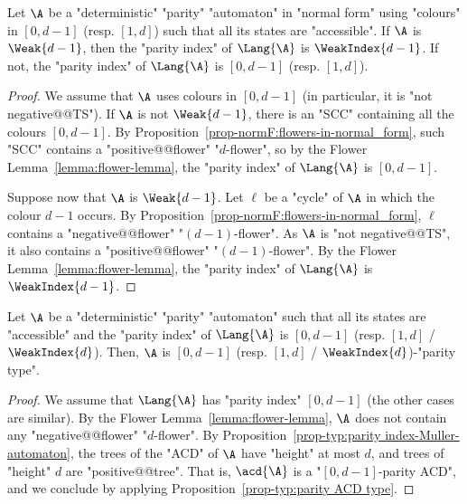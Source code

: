 \documentclass{theoretics}
\begin{document}
\begin{corollary}\label{cor-app-weak:normal-form-index-par}
	Let $\A$ be a "deterministic" "parity" "automaton" in "normal form" using "colours" in $[0,d-1]$ (resp. $[1,d]$) such that all its states are "accessible". If $\A$ is $\Weak{d-1}$, then the "parity index" of $\Lang{\A}$ is $\WeakIndex{d-1}$. If not, the "parity index" of $\Lang{\A}$ is $[0,d-1]$ (resp. $[1,d]$).
\end{corollary}
\begin{proof}
	We assume that $\A$ uses colours in $[0,d-1]$ (in particular, it is "not negative@@TS").
	If $\A$ is not $\Weak{d-1}$, there is an "SCC" containing all the colours $[0,d-1]$.  By Proposition~\ref{prop-normF:flowers-in-normal_form}, such "SCC" contains a "positive@@flower" "$d$-flower", so by the Flower Lemma~\ref{lemma:flower-lemma}, the "parity index" of $\Lang{\A}$ is $[0,d-1]$.
	
	Suppose now that $\A$ is $\Weak{d-1}$. Let $\ell$ be a "cycle" of $\A$ in which the colour $d-1$ occurs. By Proposition~\ref{prop-normF:flowers-in-normal_form}, $\ell$ contains a "negative@@flower" "$(d-1)$-flower". As $\A$ is "not negative@@TS", it also contains a "positive@@flower" "$(d-1)$-flower". By the Flower Lemma~\ref{lemma:flower-lemma}, the "parity index" of $\Lang{\A}$ is $\WeakIndex{d-1}$.	
\end{proof}


\begin{corollary}\label{cor-app-weak:index-parity-type}
	Let $\A$ be a "deterministic" "parity" "automaton" such that all its states are "accessible" and the "parity index" of $\Lang{\A}$ is $[0,d-1]$ (resp. $[1,d]$ / $\WeakIndex{d}$). 
	Then, $\A$ is $[0,d-1]$ (resp. $[1,d]$ / $\WeakIndex{d}$)-"parity type". 
\end{corollary}
\begin{proof}
	We assume that $\Lang{\A}$ has "parity index" $[0,d-1]$ (the other cases are similar). By the Flower Lemma~\ref{lemma:flower-lemma}, $\A$ does not contain any "negative@@flower" "$d$-flower". 
	By Proposition~\ref{prop-typ:parity index-Muller-automaton}, the trees of the "ACD" of $\A$ have "height" at most $d$, and trees of "height" $d$ are "positive@@tree". That is, $\acd{\A}$ is a "$[0,d-1]$-parity ACD", and we conclude by applying Proposition~\ref{prop-typ:parity ACD type}.
\end{proof}
\end{document}
